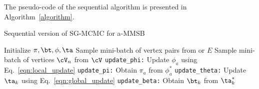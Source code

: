 The pseudo-code of the sequential algorithm is presented in Algorithm~\ref{algorithm}. 

\begin{algorithm}[t]
\caption{Sequential version of SG-MCMC for a-MMSB}\label{alg}
\begin{algorithmic}[1]
\STATE Initialize $\pi , \bt, \phi, \ta$
\STATE Sample mini-batch of vertex pairs \Minibatch from \Edges or $E$
    \STATE Sample mini-batch of vertices $\Neighbors$ from $\Vertices$
    \STATE \texttt{update\_phi:} Update $\phi_{a}$ using Eq.~\ref{eqn:local_update} \ENDFOR
    \STATE \texttt{update\_pi:} Obtain $\pi_a$ from $\phi_a^*$ \ENDFOR
{}
    \STATE \texttt{update\_theta:} Update $\ta_{k}$ using Eq.~\ref{eqn:global_update} \ENDFOR
{}
    \STATE \texttt{update\_beta:} Obtain $\bt_k$ from $\ta_k^*$ \ENDFOR
\ENDWHILE
\end{algorithmic}
\label{algorithm}
\end{algorithm}


